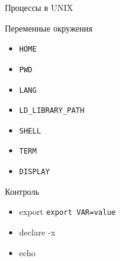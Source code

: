 \documentclass[ignorenonframetext, professionalfonts, hyperref={pdftex, unicode}]{beamer}
\begin{document}
\begin{frame}{Процессы в UNIX}
\begin{frame}{Переменные окружения}
\begin{itemize}
\item {\tt HOME}
\item {\tt PWD}
\item {\tt LANG}
\item {\tt LD_LIBRARY_PATH}
\item {\tt SHELL}
\item {\tt TERM}
\item {\tt DISPLAY}
\end{itemize}

Контроль

\begin{itemize}
\item export {\tt export VAR=value}
\item declare -x
\item echo 
\end{itemize}


\end{frame}
\end{frame}
\end{document}

